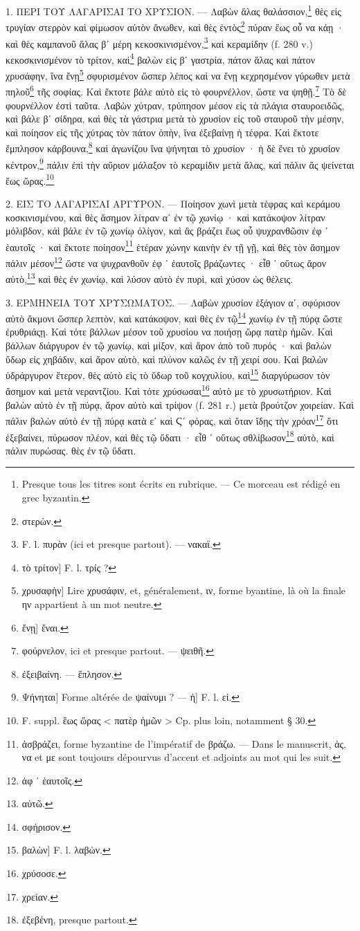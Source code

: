 \documentclass[a4paper, 11pt, oneside, polutonikogreek, french]{article}
\begin{document}
1. ΠΕΡΙ ΤΟΥ ΛΑΓΑΡΙΣΑΙ ΤΟ ΧΡΥΣΙΟΝ. --- Λαβὼν ἅλας θαλάσσιον,\footnote{Presque tous les titres sont écrits en rubrique. --- Ce morceau est rédigé en grec byzantin.} θὲς εἰς τρυγίαν στερρὸν καὶ φίμωσον αὐτὸν ἄνωθεν, καὶ θὲς ἐντὸς\footnote{στερὼν.} πύραν ἕως οὗ να κάῃ · καὶ θὲς καμπανοῦ ἅλας βʹ μέρη κεκοσκινισμένον,\footnote{F. l. πυρὰν (ici et presque partout). --- νακαϊ.} καὶ κεραμίδην (f. 280 v.) κεκοσκινισμένον τὸ τρίτον, καὶ\footnote{τὸ τρίτον] F. l. τρίς ?} βαλὼν εἰς βʹ γαστρία, πάτον ἅλας καὶ πάτον χρυσάφην, ἵνα ἔνῃ\footnote{χρυσαφὴν] Lire χρυσάφιν, et, généralement, ιν, forme byantine, là où la finale ην appartient à un mot neutre.} σφυρισμένον ὥσπερ λέπος καὶ να ἔνῃ κεχρησμένον γύρωθεν μετὰ πηλοῦ\footnote{ἔνῃ] ἔναι.} τῆς σοφίας. Καὶ ἔκτοτε βάλε αὐτὸ εἰς τὸ φουρνέλλον, ὥστε να ψηθῇ.\footnote{φούρνελον, ici et presque partout. --- ψειθῆ.} Τὸ δὲ φουρνέλλον ἐστὶ ταῦτα. Λαβὼν χύτραν, τρύπησον μέσον εἰς τὰ πλάγια σταυροειδῶς, καὶ βάλε βʹ σίδηρα, καὶ θὲς τὰ γάστρια μετὰ τὸ χρυσίον εἰς τοῦ σταυροῦ τὴν μέσην, καὶ ποίησον εἰς τῆς χύτρας τὸν πάτον ὀπὴν, ἵνα ἐξεβαίνῃ ἡ τέφρα. Καὶ ἔκτοτε ἔμπλησον κάρβουνα,\footnote{ἐξειβαίνη. --- ἔπλησον.} καὶ ἀγωνίζου ἵνα ψήνηται τὸ χρυσίον · ἡ δὲ ἔνει τὸ χρυσίον κέντρον,\footnote{Ψήνηται] Forme altérée de ψαίνυμι ? --- ἡ] F. l. εἰ.} πάλιν ἐπὶ τὴν αὔριον μάλαξον τὸ κεραμίδιν μετὰ ἅλας, καὶ πάλιν ἂς ψείνεται ἕως ὥρας.\footnote{F. suppl. ἕως ὥρας < πατὲρ ἡμῶν > Cp. plus loin, notamment § 30.}

2. ΕΙΣ ΤΟ ΛΑΓΑΡΙΣΑΙ ΑΡΓΥΡΟΝ. --- Ποίησον χωνὶ μετὰ τέφρας καὶ κεράμου κοσκινισμένου, καὶ θὲς ἄσημον λίτραν αʹ ἐν τῷ χωνίῳ · καὶ κατάκοψον λίτραν μόλιβδον, κάὶ βάλε ἐν τῷ χωνίῳ ὀλίγον, καὶ ἂς βράζει ἕως οὗ ψυχρανθῶσιν ἐφ ᾽ ἑαυτοῖς · καὶ ἔκτοτε ποίησον\footnote{ἀσβράζει, forme byzantine de l'impératif de βράζω. --- Dans le manuscrit, ἀς, να et με sont toujours dépourvus d'accent et adjoints au mot qui les suit.} ἑτέραν χώνην καινὴν ἐν τῇ γῇ, καὶ θὲς τὸν ἄσημον πάλιν μέσον\footnote{ἀφ ᾽ ἑαυτοῖς.} ὥστε να ψυχρανθοῦν ἐφ ᾽ ἑαυτοῖς βράζωντες · εἶθ ᾽ οὕτως ἄρον αὐτὸ,\footnote{αὐτῶ.} καὶ θὲς ἐν χωνίῳ, καὶ λύσον αὐτὸ ἐν πυρὶ, καὶ χύσον ὡς θέλεις.

3. ΕΡΜΗΝΕΙΑ ΤΟΥ ΧΡΥΣΩΜΑΤΟΣ. --- Λαβὼν χρυσίον ἑξάγιον αʹ, σφύρισον αὐτὸ ἄκμονι ὥσπερ λεπτὸν, καὶ κατάκοψον, καὶ θὲς ἐν τῷ\footnote{σφήρισον.} χωνίῳ ἐν τῇ πύρᾳ ὥστε ἐρυθριάςῃ. Καὶ τότε βάλλων μέσον τοῦ χρυσίου να ποιήσῃ ὥρᾳ πατὲρ ἡμῶν. Καὶ βάλλων διάργυρον ἐν τῷ χωνίῳ, καὶ μίξον, καὶ ἄρον ἀπὸ τοῦ πυρός · καὶ βαλὼν ὕδωρ εἰς χηβάδιν, καὶ ἄρον αὐτὸ, καὶ πλύνον καλῶς ἐν τῇ χειρί σου. Καὶ βαλὼν ὑδράργυρον ἕτερον, θὲς αὐτὸ εἰς τὸ ὕδωρ τοῦ κογχυλίου, καὶ\footnote{βαλὼν] F. l. λαβὼν.} διαργύρωσον τὸν ἄσημον καὶ μετὰ νεραντζίου. Καὶ τότε χρύσωσαι\footnote{χρύσοσε.} αὐτὸ με τὸ χρυσωτήριον. Καὶ βαλὼν αὐτὸ ἐν τῇ πύρᾳ, ἄρον αὐτὸ καὶ τρίψον (f. 281 r.) μετὰ βρούτζον χοιρείαν. Καὶ πάλιν βαλὼν αὐτὸ ἐν τῇ πύρᾳ κατὰ εʹ καὶ Ϛʹ φόρας, καὶ ὅταν ἴδῃς τὴν χρόαν\footnote{χρείαν.} ὅτι ἐξεβαίνει, πύρωσον πλέον, καὶ θὲς τῷ ὕδατι · εἶθ ᾽ οὕτως σθλίβωσον\footnote{ἐξεβένη, presque partout.} αὐτὸ, καὶ πάλιν πυρώσας. θὲς ἐν τῷ ὕδατι.
\end{document}
